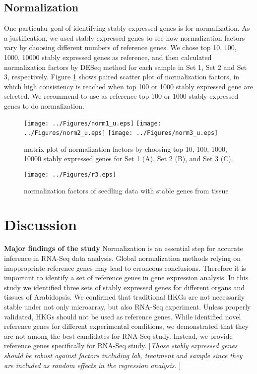 \documentclass[11pt, a4paper]{article}
\begin{document}
\subsection{Normalization}
One particular goal of identifying stably expressed genes is for normalization. As a justification, we used stably expressed genes to see how normalization factors vary by choosing different numbers of reference genes.   We chose top 10, 100, 1000, 10000 stably expressed genes as reference, and then calculated normalization factors by DESeq method for each sample in Set 1, Set 2 and Set 3, respectively. Figure \ref{fig:normfactor} shows paired scatter plot of normalization factors, in which high consistency is reached when top 100 or 1000 stably expressed gene are selected. We recommend to use as reference top 100 or 1000 stably expressed genes  to do normalization.

 \begin{figure}[h!]
\begin{center}
\texttt{[image: ../Figures/norm1\_u.eps]}
\texttt{[image: ../Figures/norm2\_u.eps]}
\texttt{[image: ../Figures/norm3\_u.eps]}
\caption{\label{fig:normfactor} matrix plot of normalization factors by choosing top 10, 100, 1000, 10000 stably expressed genes for Set 1 (A), Set 2 (B), and Set 3 (C). }
\end{center}
\end{figure}

 \begin{figure}[h!]
\begin{center}
\texttt{[image: ../Figures/r3.eps]}
\caption{\label{fig:scaled_diss} normalization factors of seedling data with stable genes from tissue }
\end{center}
\end{figure}

  \section{Discussion}
  \textbf{Major findings of the study}
  Normalization is an essential step for accurate inference in RNA-Seq data analysis. Global normalization methods relying on inappropriate reference genes may lead to erroneous conclusions. Therefore it is important to identify a set of reference genes in gene expression analysis.  In this study we identified three sets of stably expressed genes for different organs and tissues of Arabidopsis. We confirmed  that traditional HKGs are not necessarily stable under not only microarray, but also RNA-Seq experiment. Unless properly validated, HKGs  should not be used as reference genes. While \cite{czechowski2005genome} identified novel reference genes for different experimental conditions, we demonstrated that they are not among the best candidates for RNA-Seq study.  Instead, we provide reference genes specifically for RNA-Seq study.   [\textit{Those stably expressed genes should be robust against factors including lab, treatment and sample since they are included as random effects in the regression analysis.  }]
   
\end{document}
